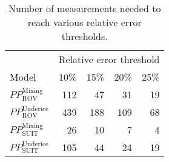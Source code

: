 \begin{table}[ht]
\centering
\begin{tabular}{lrrrr}
  \toprule
  & \multicolumn{4}{c}{Relative error threshold} \\
 Model & 10\% & 15\% & 20\% & 25\% \\
 \midrule
$PP^{\mathrm{Mixing}}_{\mathrm{ROV}}$ & 112 & 47 & 31 & 19 \\ 
  $PP^{\mathrm{Underice}}_{\mathrm{ROV}}$ & 439 & 188 & 109 & 68 \\ 
  $PP^{\mathrm{Mixing}}_{\mathrm{SUIT}}$ & 26 & 10 & 7 & 4 \\ 
  $PP^{\mathrm{Underice}}_{\mathrm{SUIT}}$ & 105 & 44 & 24 & 19 \\ 
   \bottomrule
\end{tabular}
\caption{Number of measurements needed to reach various relative error thresholds.} 
\end{table}
